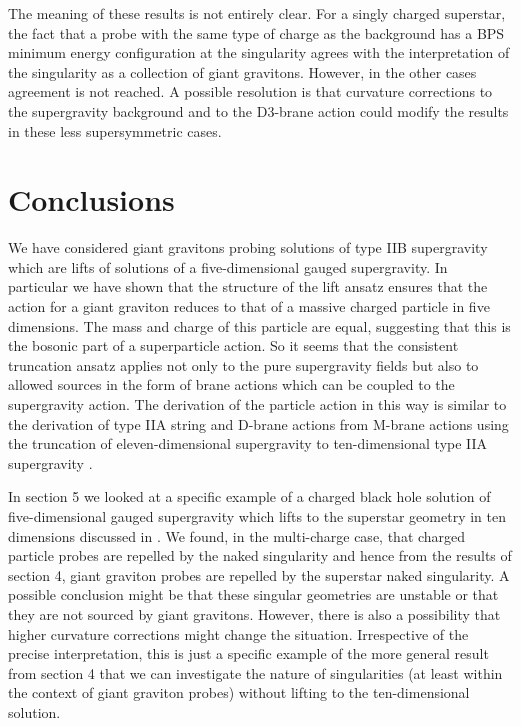 \documentclass[a4paper,12pt]{article}
\begin{document}
The meaning of these results is not entirely clear. For a singly charged superstar, the fact that a probe with the same type of charge as the background has a BPS minimum energy configuration at the singularity agrees with the interpretation of the singularity as a collection of giant gravitons. However, in the other cases agreement is not reached. A possible resolution is that curvature corrections to the supergravity background and to the D3-brane action could modify the results in these less supersymmetric cases.
 
\section{Conclusions}

We have considered giant gravitons probing solutions of type IIB supergravity which are lifts of solutions of a five-dimensional gauged supergravity.  In
particular we have shown that the structure of the lift ansatz ensures that the
action for a giant graviton reduces to that of a massive charged particle in
five dimensions. The mass and charge of this particle are equal, suggesting that this is the
bosonic part of a superparticle action. So it seems that the consistent
truncation ansatz applies not only to the pure supergravity fields but also to
allowed sources in the form of brane actions which can be coupled to the
supergravity action. The derivation of the particle action in this way is
similar to the derivation of type IIA string and D-brane actions from M-brane
actions using the truncation of eleven-dimensional supergravity to
ten-dimensional type IIA supergravity \cite{Duff:1987bx, Townsend:1996af}.

In section 5 we looked at a specific example of a charged \coordHE{} black hole
solution of five-dimensional gauged supergravity which lifts to the superstar
geometry in ten dimensions discussed in \cite{Myers:2001aq, Leblond:2001gn}.
We found, in the multi-charge case, that charged particle probes are repelled
by the naked singularity and hence from the results of section 4, giant
graviton probes are repelled by the superstar naked singularity. A possible
conclusion might be that these singular geometries are unstable or that they
are not sourced by giant gravitons. However, there is also a possibility that
higher curvature corrections might change the situation. Irrespective of the
precise interpretation, this is just a specific example of the more general
result from section 4 that we can investigate the nature of singularities (at
least within the context of giant graviton probes) without lifting to the
ten-dimensional solution.
\end{document}
